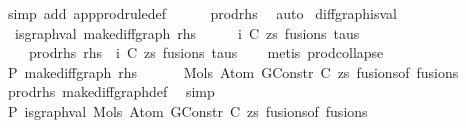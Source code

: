 \begin{isabellebody}
\ {\isacharparenleft}{\kern0pt}simp\ add{\isacharcolon}{\kern0pt}\ app{\isacharunderscore}{\kern0pt}prodrule{\isacharunderscore}{\kern0pt}def{\isacharparenright}{\kern0pt}\isanewline
\ \ \ \ \isamarkupfalse%
\ prod{\isacharunderscore}{\kern0pt}rhs\ \isamarkupfalse%
\ auto\isanewline
{}\isamarkupfalse%
%
\endisatagproof
{\isafoldproof}%
%
\isadelimproof
\isanewline
%
\endisadelimproof
\isanewline
\isanewline
{}\isamarkupfalse%
\ diffgraph{\isacharunderscore}{\kern0pt}is{\isacharunderscore}{\kern0pt}val{\isacharcolon}{\kern0pt}\isanewline
\ \ {\isachardoublequoteopen}is{\isacharunderscore}{\kern0pt}graph{\isacharunderscore}{\kern0pt}val\ {\isacharparenleft}{\kern0pt}make{\isacharunderscore}{\kern0pt}diffgraph\ rhs{\isacharparenright}{\kern0pt}{\isachardoublequoteclose}\isanewline
%
\isadelimproof
%
\endisadelimproof
%
\isatagproof
{}\isamarkupfalse%
\ {\isacharminus}{\kern0pt}\isanewline
\ \ \isamarkupfalse%
\ i\ C\ zs\ fusions\ taus\ \isanewline
\ \ \ \ prod{\isacharunderscore}{\kern0pt}rhs{\isacharcolon}{\kern0pt}\ {\isachardoublequoteopen}rhs\ {\isacharequal}{\kern0pt}\ {\isacharparenleft}{\kern0pt}i{\isacharcomma}{\kern0pt}\ {\isacharparenleft}{\kern0pt}C{\isacharcomma}{\kern0pt}\ zs{\isacharparenright}{\kern0pt}{\isacharcomma}{\kern0pt}\ fusions{\isacharcomma}{\kern0pt}\ taus{\isacharparenright}{\kern0pt}{\isachardoublequoteclose}\isanewline
\ \ \isamarkupfalse%
\ {\isacharparenleft}{\kern0pt}metis\ prod{\isachardot}{\kern0pt}collapse{\isacharparenright}{\kern0pt}\isanewline
\isanewline
\ \ \isamarkupfalse%
\ P{}{\isacharcolon}{\kern0pt}\ {\isachardoublequoteopen}make{\isacharunderscore}{\kern0pt}diffgraph\ rhs\ {\isacharequal}{\kern0pt}\ \isanewline
\ \ \ \ Mols{}\ {\isacharparenleft}{\kern0pt}Atom\ {\isacharparenleft}{\kern0pt}GConstr\ C{\isacharparenright}{\kern0pt}\ zs{\isacharparenright}{\kern0pt}\ {\isacharparenleft}{\kern0pt}fusions{\isacharunderscore}{\kern0pt}of\ fusions{\isacharparenright}{\kern0pt}{\isachardoublequoteclose}\isanewline
\ \ \ \ \isamarkupfalse%
\ prod{\isacharunderscore}{\kern0pt}rhs\ make{\isacharunderscore}{\kern0pt}diffgraph{\isacharunderscore}{\kern0pt}def\ \isamarkupfalse%
\ simp\isanewline
\ \ \ \ \isamarkupfalse%
\isanewline
\isanewline
\ \ \isamarkupfalse%
\ P{}{\isacharcolon}{\kern0pt}\ {\isachardoublequoteopen}is{\isacharunderscore}{\kern0pt}graph{\isacharunderscore}{\kern0pt}val\ {\isacharparenleft}{\kern0pt}Mols{}\ {\isacharparenleft}{\kern0pt}Atom\ {\isacharparenleft}{\kern0pt}GConstr\ C{\isacharparenright}{\kern0pt}\ zs{\isacharparenright}{\kern0pt}\ {\isacharparenleft}{\kern0pt}fusions{\isacharunderscore}{\kern0pt}of\ fusions{\isacharparenright}{\kern0pt}{\isacharparenright}{\kern0pt}{\isachardoublequoteclose}\isanewline

\end{isabellebody}
